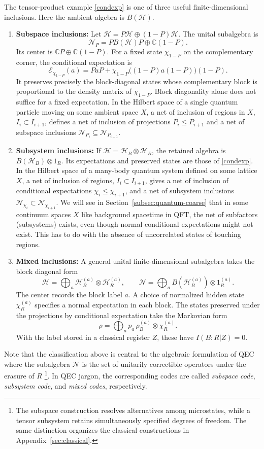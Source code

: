 \documentclass[a4paper,11pt]{article}
\theoremstyle{definition}
\newcommand{\mN}{\mathcal{N}}
\newcommand{\mE}{\mathcal{E}}
\begin{document}
The tensor-product example \eqref{condexp} is one of three useful finite-dimensional
inclusions. Here the ambient algebra is $B(\mathcal H)$.
\begin{enumerate}
 \item {\bf Subspace inclusions:} Let $\mathcal H=P\mathcal H\oplus(1-P)\mathcal H$.
 The unital subalgebra is
 \[
  \mN_P=P B(\mathcal H)P\oplus\mathbb C(1-P).
 \]
 Its center is $\mathbb CP\oplus\mathbb C(1-P)$. For a fixed state $\chi_{1-P}$
 on the complementary corner, the conditional expectation is
 \[
  \mE_{\chi_{1-P}}(a)=PaP+
  \chi_{1-P}\bigl((1-P)a(1-P)\bigr)(1-P).
 \]
 It preserves precisely the block-diagonal states whose complementary block
 is proportional to the density matrix of $\chi_{1-P}$.
 Block diagonality alone does not suffice for a fixed expectation.
In the Hilbert space of a single quantum particle moving on some ambient space $X$, a net of inclusion of regions in $X$, $I_i\subset I_{i+1}$, defines a net of inclusion of projections $P_i\leq P_{i+1}$ and a net of subspace inclusions $\mN_{P_i}\subseteq\mN_{P_{i+1}}$. 
 
 \item {\bf Subsystem inclusions:} If $\mathcal H=\mathcal H_B\otimes\mathcal H_R$,
 the retained algebra is $B(\mathcal H_B)\otimes1_R$.
 Its expectations and preserved states are those of \eqref{condexp}. In the Hilbert space of a many-body quantum system defined on some lattice $X$, a net of inclusion of regions, $I_i\subset I_{i+1}$, gives a net of inclusion of conditional expectations $\chi_i \leq\chi_{i+1}$, and a net of subsystem inclusions $\mN_{\chi_i}\subset \mN_{\chi_{i+1}}$. We will see in Section~\ref{subsec:quantum-coarse} that in some continuum spaces $X$ like background spacetime in QFT, the net of subfactors (subsystems) exists, even though normal conditional expectations might not exist. This has to do with the absence of uncorrelated states of touching regions.
 
 \item {\bf Mixed inclusions:} A general unital finite-dimensional subalgebra takes the block diagonal form
 \[
  \mathcal H=\bigoplus_a\mathcal H_B^{(a)}\otimes\mathcal H_R^{(a)},\qquad
  \mN=\bigoplus_a B(\mathcal H_B^{(a)})\otimes1_R^{(a)}.
 \]
 The center records the block label $a$. A choice of normalized hidden state $\chi_R^{(a)}$ specifies a normal
 expectation in each block. The states preserved under the projections by conditional expectation take the Markovian form
 \[
  \rho=\bigoplus_a p_a\,\rho_B^{(a)}\otimes\chi_R^{(a)}.
 \]
 With the label stored in a classical register $Z$, these have $I(B:R|Z)=0$.
\end{enumerate}
Note that the classification above is central to the algebraic formulation of QEC where the subalgebra $\mN$ is the set of unitarily correctible operators under the erasure of $R$ \cite{} \footnote{The subspace construction resolves alternatives among microstates, while a tensor
subsystem retains simultaneously specified degrees of freedom. The same distinction
organizes the classical constructions in Appendix~\ref{sec:classical}.
}. In QEC jargon, the corresponding codes are called {\it subspace code}, {\it subsystem code}, and {\it mixed codes}, respectively.
\end{document}
